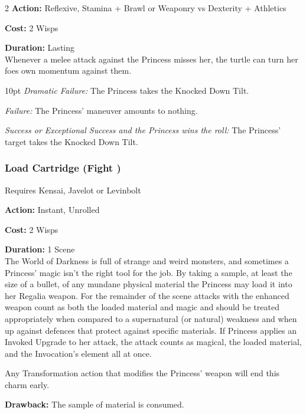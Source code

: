 \begin{multicols}{2}
\noindent \textbf{Action:} Reflexive, Stamina + Brawl or Weaponry vs Dexterity + Athletics

\noindent \textbf{Cost:} 2 Wisps

\noindent \textbf{Duration:} Lasting \\

Whenever a melee attack against the Princess misses her, the turtle can turn her foes own momentum against them. 

\begin{myindentpar}{10pt} 
\emph{Dramatic Failure:}  The Princess takes the Knocked Down Tilt.

\emph{Failure:} The Princess' maneuver amounts to nothing. 

\emph{Success or Exceptional Success and the Princess wins the roll:}  The Princess' target takes the Knocked Down Tilt.\end{myindentpar}


\subsubsection*{Load Cartridge (Fight \textbullet\textbullet\textbullet)}
\noindent Requires Kensai, Javelot or Levinbolt

\noindent \textbf{Action:} Instant, Unrolled

\noindent \textbf{Cost:} 2 Wisps

\noindent \textbf{Duration:} 1 Scene \\

The World of Darkness is full of strange and weird monsters, and sometimes a Princess' magic isn't the right tool for the job. By taking a sample, at least the size of a bullet, of any mundane physical material the Princess may load it into her Regalia weapon. For the remainder of the scene attacks with the enhanced weapon count as both the loaded material and magic and should be treated appropriately when compared to a supernatural (or natural) weakness and when up against defences that protect against specific materials. If Princess applies an Invoked Upgrade to her attack, the attack counts as magical, the loaded material, and the Invocation's element all at once. 

Any Transformation action that modifies the Princess' weapon will end this charm early. 

\textbf{Drawback:} The sample of material is consumed.



\end{multicols}
